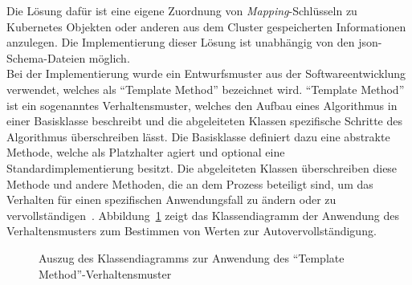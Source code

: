 Die Lösung dafür ist eine eigene Zuordnung von \textit{Mapping}-Schlüsseln zu Kubernetes Objekten oder anderen aus dem Cluster gespeicherten Informationen anzulegen.
Die Implementierung dieser Lösung ist unabhängig von den \ac{json}-Schema-Dateien möglich.
\\
Bei der Implementierung wurde ein Entwurfsmuster aus der Softwareentwicklung verwendet, welches als ``Template Method'' bezeichnet wird.
``Template Method'' ist ein sogenanntes Verhaltensmuster, welches den Aufbau eines Algorithmus in einer Basisklasse beschreibt und
die abgeleiteten Klassen spezifische Schritte des Algorithmus überschreiben lässt.
Die Basisklasse definiert dazu eine abstrakte Methode, welche als Platzhalter agiert und optional eine Standardimplementierung besitzt.
Die abgeleiteten Klassen überschreiben diese Methode und andere Methoden, die an dem Prozess beteiligt sind, um
das Verhalten für einen spezifischen Anwendungsfall zu ändern oder zu vervollständigen~\cite{typescript-design-pattern-chapter-6,design-patterns-refactoring-guru}.
Abbildung~\ref{fig:class-diagram-completion-rule} zeigt das Klassendiagramm der Anwendung des Verhaltensmusters zum Bestimmen von Werten zur Autovervollständigung.

\begin{figure}[htp] %
      \centering
      \caption{Auszug des Klassendiagramms zur Anwendung des ``Template Method''-Verhaltensmuster}
      \label{fig:class-diagram-completion-rule}
\end{figure}

